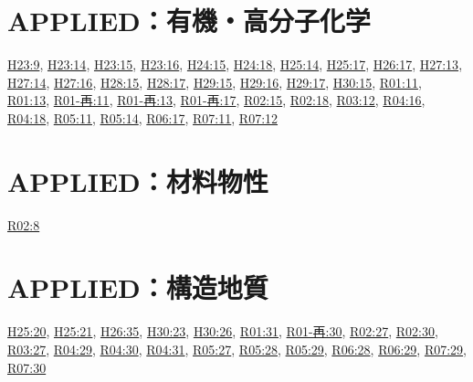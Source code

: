 \section{APPLIED：有機・高分子化学}
\hyperref[q:h23-reg-applied-09]{H23:9}, \hyperref[q:h23-reg-applied-14]{H23:14}, \hyperref[q:h23-reg-applied-15]{H23:15}, \hyperref[q:h23-reg-applied-16]{H23:16}, \hyperref[q:h24-reg-applied-15]{H24:15}, \hyperref[q:h24-reg-applied-18]{H24:18}, \hyperref[q:h25-reg-applied-14]{H25:14}, \hyperref[q:h25-reg-applied-17]{H25:17}, \hyperref[q:h26-reg-applied-17]{H26:17}, \hyperref[q:h27-reg-applied-13]{H27:13}, \hyperref[q:h27-reg-applied-14]{H27:14}, \hyperref[q:h27-reg-applied-16]{H27:16}, \hyperref[q:h28-reg-applied-15]{H28:15}, \hyperref[q:h28-reg-applied-17]{H28:17}, \hyperref[q:h29-reg-applied-15]{H29:15}, \hyperref[q:h29-reg-applied-16]{H29:16}, \hyperref[q:h29-reg-applied-17]{H29:17}, \hyperref[q:h30-reg-applied-15]{H30:15}, \hyperref[q:r01-reg-applied-11]{R01:11}, \hyperref[q:r01-reg-applied-13]{R01:13}, \hyperref[q:r01-ret-applied-11]{R01-再:11}, \hyperref[q:r01-ret-applied-13]{R01-再:13}, \hyperref[q:r01-ret-applied-17]{R01-再:17}, \hyperref[q:r02-reg-applied-15]{R02:15}, \hyperref[q:r02-reg-applied-18]{R02:18}, \hyperref[q:r03-reg-applied-12]{R03:12}, \hyperref[q:r04-reg-applied-16]{R04:16}, \hyperref[q:r04-reg-applied-18]{R04:18}, \hyperref[q:r05-reg-applied-11]{R05:11}, \hyperref[q:r05-reg-applied-14]{R05:14}, \hyperref[q:r06-reg-applied-17]{R06:17}, \hyperref[q:r07-reg-applied-11]{R07:11}, \hyperref[q:r07-reg-applied-12]{R07:12}
\section{APPLIED：材料物性}
\hyperref[q:r02-reg-applied-08]{R02:8}
\section{APPLIED：構造地質}
\hyperref[q:h25-reg-applied-20]{H25:20}, \hyperref[q:h25-reg-applied-21]{H25:21}, \hyperref[q:h26-reg-applied-35]{H26:35}, \hyperref[q:h30-reg-applied-23]{H30:23}, \hyperref[q:h30-reg-applied-26]{H30:26}, \hyperref[q:r01-reg-applied-31]{R01:31}, \hyperref[q:r01-ret-applied-30]{R01-再:30}, \hyperref[q:r02-reg-applied-27]{R02:27}, \hyperref[q:r02-reg-applied-30]{R02:30}, \hyperref[q:r03-reg-applied-27]{R03:27}, \hyperref[q:r04-reg-applied-29]{R04:29}, \hyperref[q:r04-reg-applied-30]{R04:30}, \hyperref[q:r04-reg-applied-31]{R04:31}, \hyperref[q:r05-reg-applied-27]{R05:27}, \hyperref[q:r05-reg-applied-28]{R05:28}, \hyperref[q:r05-reg-applied-29]{R05:29}, \hyperref[q:r06-reg-applied-28]{R06:28}, \hyperref[q:r06-reg-applied-29]{R06:29}, \hyperref[q:r07-reg-applied-29]{R07:29}, \hyperref[q:r07-reg-applied-30]{R07:30}

